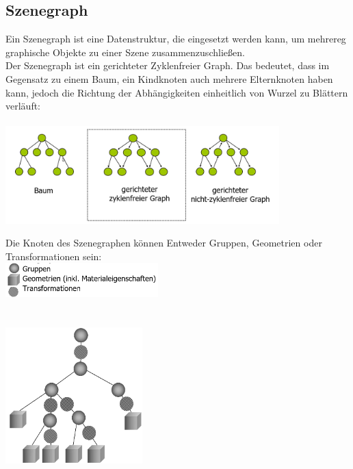 \subsection{Szenegraph}
Ein Szenegraph ist eine Datenstruktur, die eingesetzt werden kann, um mehrereg graphische Objekte zu einer Szene zusammenzuschließen.\\
Der Szenegraph ist ein gerichteter Zyklenfreier Graph. Das bedeutet, dass im Gegensatz zu einem Baum, ein Kindknoten auch mehrere Elternknoten haben kann, jedoch die Richtung der Abhängigkeiten einheitlich von Wurzel zu Blättern verläuft:
\\\\

\includegraphics[width=400px]{images/gerichteterZyklenfreierGraph.png}

Die Knoten des Szenegraphen können Entweder Gruppen, Geometrien oder Transformationen sein:
\\

\includegraphics[height=50px]{images/Szenegraph_Knotentypen.png}
\\\\\\
\includegraphics[width=200px]{images/Szenegraph_Beispiel.png}
\\\\

